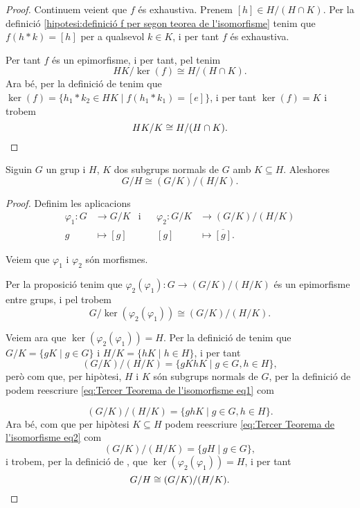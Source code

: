 \documentclass[../../Main.tex]{subfiles}
\begin{document}
\begin{theorem}
\begin{proof}
			Continuem veient que \(f\) és exhaustiva. Prenem \([h]\in H/(H\cap K)\). Per la definició \eqref{hipotesi:definició f per segon teorea de l'isomorfisme} tenim que \(f(h\ast k)=[h]\) per a qualsevol \(k\in K\), i per tant \(f\) és exhaustiva.
			
			Per tant \(f\) és un epimorfisme, i per tant, pel  tenim
			\[HK/\ker(f)\cong H/(H\cap K).\]
			Ara bé, per la definició de  tenim que \(\ker(f)=\{h_{1}\ast k_{2}\in HK\mid f(h_{1}\ast k_{1})=[e]\}\), i per tant \(\ker(f)=K\) i trobem
			\[HK/K\cong H/(H\cap K).\qedhere\]
		\end{proof}
	\end{theorem}
	\begin{theorem}
		\label{thm:Tercer Teorema de l'isomorfisme entre grups}
		Siguin \(G\) un grup i \(H\), \(K\) dos subgrups normals de \(G\) amb \(K\subseteq H\). Aleshores
		\[G/H\cong (G/K)/(H/K).\]
		\begin{proof}
			Definim les aplicacions
			\begin{align*}
			\varphi_{1}\colon G&\longrightarrow G/K&\text{i}&&\varphi_{2}\colon G/K&\longrightarrow(G/K)/(H/K)\\
			g&\longmapsto[g]&&&[g]&\longmapsto\overline{[g]}.
			\end{align*}
			
			Veiem que \(\varphi_{1}\) i \(\varphi_{2}\) són morfismes.
			
			Per la proposició  tenim que \(\varphi_{2}(\varphi_{1})\colon G\longrightarrow(G/K)/(H/K)\) és un epimorfisme entre grups, %
			i pel  trobem
			\[G/\ker(\varphi_{2}(\varphi_{1}))\cong(G/K)/(H/K).\]
			
			Veiem ara que \(\ker(\varphi_{2}(\varphi_{1}))=H\). Per la definició de  tenim que \(G/K=\{gK\mid g\in G\}\) i \(H/K=\{hK\mid h\in H\}\), i per tant
			\begin{equation}
			\label{eq:Tercer Teorema de l'isomorfisme eq1}
			(G/K)/(H/K)=\{gKhK\mid g\in G, h\in H\},
			\end{equation}
			però com que, per hipòtesi, \(H\) i \(K\) són subgrups normals de \(G\), per la definició de  podem reescriure \eqref{eq:Tercer Teorema de l'isomorfisme eq1} com
			
			\begin{equation}\label{eq:Tercer Teorema de l'isomorfisme eq2}
			(G/K)/(H/K)=\{ghK\mid g\in G,h\in H\}.
			\end{equation}
			Ara bé, com que per hipòtesi \(K\subseteq H\) podem reescriure \eqref{eq:Tercer Teorema de l'isomorfisme eq2} com
			\[(G/K)/(H/K)=\{gH\mid g\in G\},\]
			i trobem, per la definició de , que \(\ker(\varphi_{2}(\varphi_{1}))=H\), i per tant
			\[G/H\cong (G/K)/(H/K).\qedhere\]
		\end{proof}
	\end{theorem}
\end{document}
